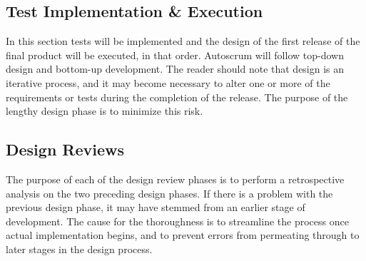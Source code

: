 \documentclass[12pt]{article}
\begin{document}
\subsection{Test Implementation \& Execution}
In this section tests will be implemented and the design of the first release
of the final product will be executed, in that order. Autoscrum will follow
top-down design and bottom-up development. The reader should note that design
is an iterative process, and it may become necessary to alter one or more of
the requirements or tests during the completion of the release. The purpose of
the lengthy design phase is to minimize this risk.

\subsection{Design Reviews}
\label{sec:review}
The purpose of each of the design review phases is to perform a retrospective
analysis on the two preceding design phases. If there is a problem with the
previous design phase, it may have stemmed from an earlier stage of
development. The cause for the thoroughness is to streamline the process once
actual implementation begins, and to prevent errors from permeating through to
later stages in the design process.
\end{document}
